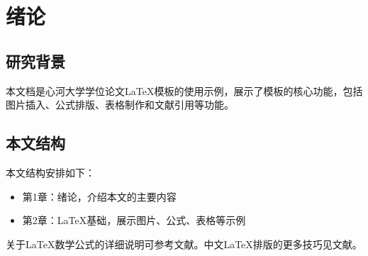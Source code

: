 
\chapter{绪论}

\section{研究背景}

本文档是心河大学学位论文LaTeX模板的使用示例，展示了模板的核心功能\cite{lamport1994latex}，包括图片插入、公式排版、表格制作和文献引用等功能\cite{mittelbach2004latex}。

\section{本文结构}

本文结构安排如下：

\begin{itemize}
    \item 第1章：绪论，介绍本文的主要内容
    \item 第2章：LaTeX基础，展示图片、公式、表格等示例
\end{itemize}

关于LaTeX数学公式的详细说明可参考文献\cite{knuth1984texbook}。中文LaTeX排版的更多技巧见文献\cite{liuhaiyang2013latex}。
